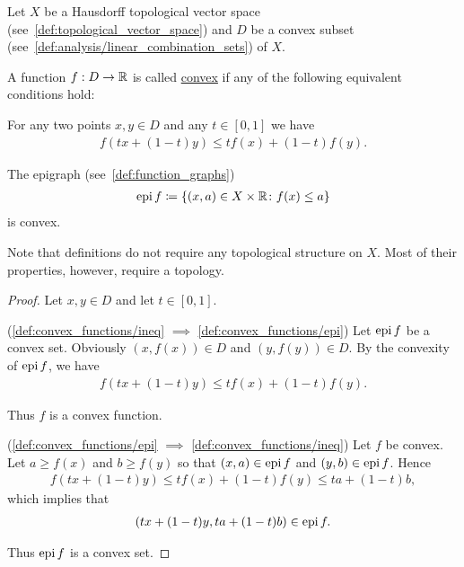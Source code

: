 Let $X$ be a Hausdorff topological vector space (see~\cref{def:topological_vector_space}) and $D$ be a convex subset (see~\cref{def:analysis/linear_combination_sets}) of $X$.

\begin{definition}\label{def:convex_functions}
  A function $f: D \to \mathbb R$ is called \uline{convex} if any of the following equivalent conditions hold:

  \begin{defenum}
    \item\label{def:convex_functions/ineq} For any two points $x, y \in D$ and any $t \in [0, 1]$ we have
    \begin{align*}
      f(tx + (1-t)y) \leq tf(x) + (1-t)f(y).
    \end{align*}

    \item\label{def:convex_functions/epi} The epigraph (see~\cref{def:function_graphs})
    \begin{align*}
      \operatorname{epi} f \coloneqq \{ (x, a) \in X \times \mathbb R \colon f(x) \leq a \}
    \end{align*}
    is convex.
  \end{defenum}

  Note that definitions do not require any topological structure on $X$. Most of their properties, however, require a topology.
\end{definition}
\begin{proof}
  Let $x, y \in D$ and let $t \in [0, 1]$.

  (\ref{def:convex_functions/ineq} $\implies$ \ref{def:convex_functions/epi}) Let $\operatorname{epi} f$ be a convex set. Obviously $(x, f(x)) \in D$ and $(y, f(y)) \in D$. By the convexity of $\operatorname{epi} f$, we have
  \begin{align*}
    f(tx + (1-t)y) \leq tf(x) + (1-t)f(y).
  \end{align*}

  Thus $f$ is a convex function.

  (\ref{def:convex_functions/epi} $\implies$ \ref{def:convex_functions/ineq}) Let $f$ be convex. Let $a \geq f(x)$ and $b \geq f(y)$ so that $(x, a) \in \operatorname{epi} f$ and $(y, b) \in \operatorname{epi} f$. Hence
  \begin{align*}
    f(tx + (1-t)y) \leq tf(x) + (1-t)f(y) \leq ta + (1-t)b,
  \end{align*}
  which implies that
  \begin{align*}
    (tx + (1-t)y, ta + (1-t)b) \in \operatorname{epi} f.
  \end{align*}

  Thus $\operatorname{epi} f$ is a convex set.
\end{proof}

